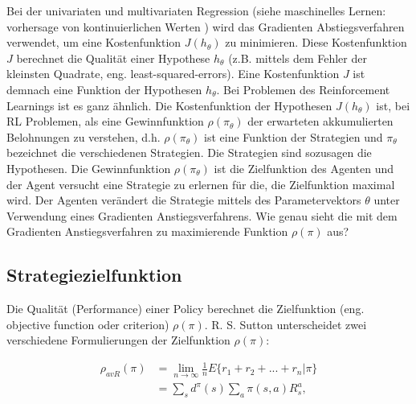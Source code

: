 \documentclass[conference]{IEEEtran}
\begin{document}
Bei der univariaten und multivariaten Regression (siehe maschinelles Lernen: vorhersage von kontinuierlichen Werten \cite{goodfellow_16}) wird das Gradienten Abstiegsverfahren verwendet, um eine Kostenfunktion $J(h_\theta)$ zu minimieren. Diese Kostenfunktion $J$ berechnet die Qualität einer Hypothese $h_\theta$ (z.B. mittels dem Fehler der kleinsten Quadrate, eng. least-squared-errors). Eine Kostenfunktion $J$ ist demnach eine Funktion der Hypothesen $h_\theta$. Bei Problemen des Reinforcement Learnings ist es ganz ähnlich. Die Kostenfunktion der Hypothesen $J(h_\theta)$ ist, bei RL Problemen, als eine Gewinnfunktion $\rho(\pi_\theta)$ der erwarteten akkumulierten Belohnungen zu verstehen, d.h. $\rho(\pi_\theta)$ ist eine Funktion der Strategien und $\pi_\theta$ bezeichnet die verschiedenen Strategien. Die Strategien sind sozusagen die Hypothesen. Die Gewinnfunktion $\rho(\pi_\theta)$ ist die Zielfunktion des Agenten und der Agent versucht eine Strategie zu erlernen für die, die Zielfunktion maximal wird. Der Agenten verändert die Strategie mittels des Parametervektors $\theta$ unter Verwendung eines Gradienten Anstiegsverfahrens. Wie genau sieht die mit dem Gradienten Anstiegsverfahren zu maximierende Funktion $\rho(\pi)$ aus?

\subsection{Strategiezielfunktion}
Die Qualität (Performance) einer Policy berechnet die Zielfunktion (eng. objective function oder criterion) $\rho(\pi)$. R. S. Sutton \cite{sutton_99} unterscheidet zwei verschiedene Formulierungen der Zielfunktion $\rho(\pi)$: 

\begin{equation*}
\begin{aligned}
\rho_{avR}(\pi) & = \lim\limits_{n \rightarrow \infty}{\frac{1}{n} E\{r_1 + r_2 + ... + r_n | \pi\}} \\
& = \sum_s d^\pi (s) \sum_a \pi(s,a) R^a_s,
\end{aligned}
\end{equation*}
\end{document}
